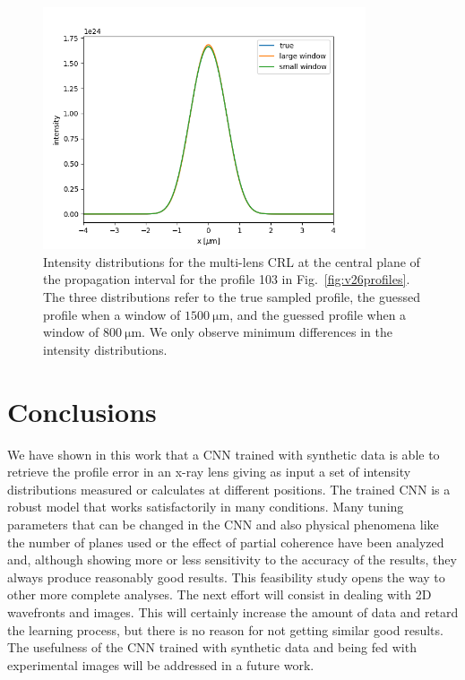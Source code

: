 \documentclass[preprint]{iucr}
\begin{document}
\begin{figure}\label{fig:figure8}
\includegraphics[width=0.85\textwidth]{figures/figure8.png}

\caption{
Intensity distributions for the multi-lens CRL at the central plane of the propagation interval for the profile 103 in Fig.~\ref{fig:v26profiles}. The three distributions refer to the true sampled profile, the guessed profile when a window of $\SI{1500}{\micro\meter}$, and the guessed profile when a window of $\SI{800}{\micro\meter}$. We only observe  minimum differences in the intensity distributions.
    }
\end{figure}

\section{Conclusions}\label{sec:conclusions}

We have shown in this work that a CNN trained with synthetic data is able to retrieve the profile error in an x-ray lens giving as input a set of intensity distributions measured or calculates at different positions. The trained CNN is a robust model that works satisfactorily in many conditions. Many tuning parameters that can be changed in the CNN and also physical phenomena like the number of planes used or the effect of partial coherence have been analyzed and, although showing more or less sensitivity to the accuracy of the results, they always produce reasonably good results. This feasibility study opens the way to other more complete analyses. The next effort will consist in dealing with 2D wavefronts and images. This will certainly increase the amount of data and retard the learning process, but there is no reason for not getting similar good results. The usefulness of the CNN trained with synthetic data and being fed with  experimental images will be addressed in a future work.  
\end{document}
